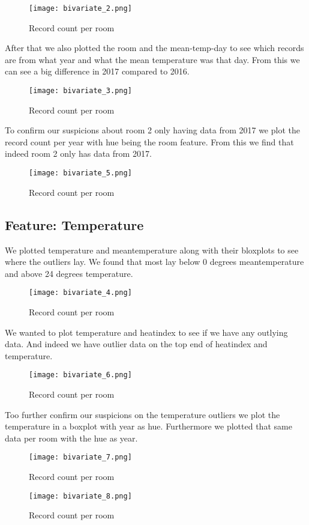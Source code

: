 \documentclass[]{article}
\begin{document}
\begin{figure}[H]
	\centering
	\texttt{[image: bivariate\_2.png]}
	\caption{Record count per room}
\end{figure}

After that we also plotted the room and the mean-temp-day to see which records are from what year and what the mean temperature was that day. From this we can see a big difference in 2017 compared to 2016.

\begin{figure}[H]
	\centering
	\texttt{[image: bivariate\_3.png]}
	\caption{Record count per room}
\end{figure}

To confirm our suspicions about room 2 only having data from 2017 we plot the record count per year with hue being the room feature. From this we find that indeed room 2 only has data from 2017.

\begin{figure}[H]
	\centering
	\texttt{[image: bivariate\_5.png]}
	\caption{Record count per room}
\end{figure}

\subsection{Feature: Temperature}
We plotted temperature and meantemperature along with their bloxplots to see where the outliers lay. We found that most lay below 0 degrees meantemperature and above 24 degrees temperature.
\begin{figure}[H]
	\centering
	\texttt{[image: bivariate\_4.png]}
	\caption{Record count per room}
\end{figure}

We wanted to plot temperature and heatindex to see if we have any outlying data. And indeed we have outlier data on the top end of heatindex and temperature.
\begin{figure}[H]
	\centering
	\texttt{[image: bivariate\_6.png]}
	\caption{Record count per room}
\end{figure}

Too further confirm our suspicions on the temperature outliers we plot the temperature in a boxplot with year as hue. Furthermore we plotted that same data per room with the hue as year.
\begin{figure}[H]
	\centering
	\texttt{[image: bivariate\_7.png]}
	\caption{Record count per room}
\end{figure}

\begin{figure}[H]
	\centering
	\texttt{[image: bivariate\_8.png]}
	\caption{Record count per room}
\end{figure}
\end{document}
